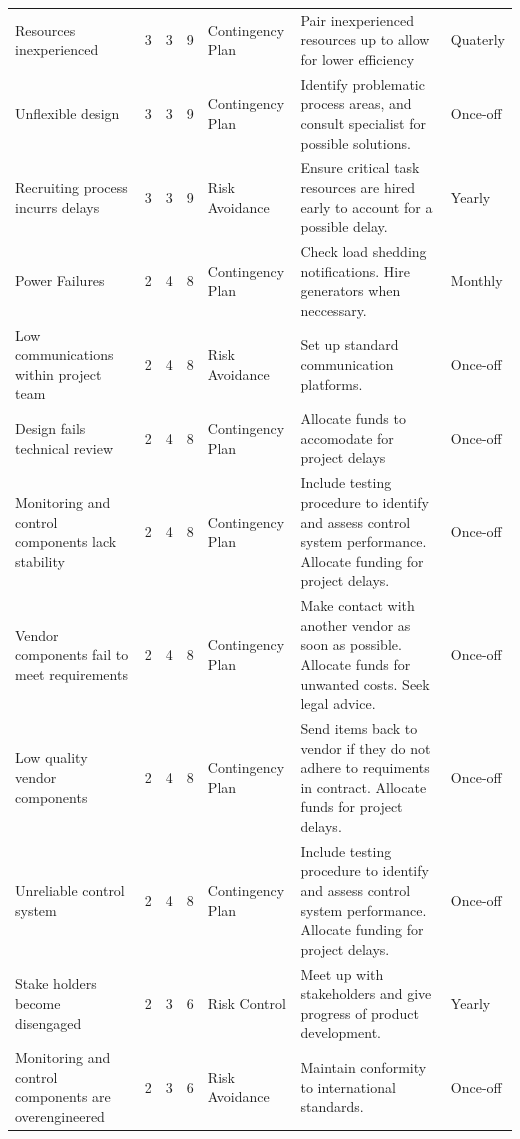 \begin{landscape}
\begin{table}[H]
{\begin{tabular}{lllllll}
Resources inexperienced & 3 & 3 & \cellcolor[HTML]{F8FF00}9 & Contingency Plan & Pair inexperienced resources up to allow for lower efficiency & Quaterly \\
Unflexible design & 3 & 3 & \cellcolor[HTML]{F8FF00}9 & Contingency Plan & Identify problematic process areas, and consult specialist for possible solutions. & Once-off \\
Recruiting process incurrs delays & 3 & 3 & \cellcolor[HTML]{F8FF00}9 & Risk Avoidance & Ensure critical task resources are hired early to account for a possible delay. & Yearly \\
Power Failures & 2 & 4 & \cellcolor[HTML]{F8FF00}8 & Contingency Plan & Check load shedding notifications. Hire generators when neccessary. & Monthly \\
Low communications within project team & 2 & 4 & \cellcolor[HTML]{F8FF00}8 & Risk Avoidance & Set up standard communication platforms. & Once-off \\
Design fails technical review & 2 & 4 & \cellcolor[HTML]{F8FF00}8 & Contingency Plan & Allocate funds to accomodate for project delays & Once-off \\
Monitoring and control components lack stability & 2 & 4 & \cellcolor[HTML]{F8FF00}8 & Contingency Plan & Include testing procedure to identify and assess control system performance. Allocate funding for project delays. & Once-off \\
Vendor components fail to meet requirements & 2 & 4 & \cellcolor[HTML]{F8FF00}8 & Contingency Plan & Make contact with another vendor as soon as possible. Allocate funds for unwanted costs. Seek legal advice. & Once-off \\
Low quality vendor components & 2 & 4 & \cellcolor[HTML]{F8FF00}8 & Contingency Plan & Send items back to vendor if they do not adhere to requiments in contract. Allocate funds for project delays. & Once-off \\
Unreliable control system & 2 & 4 & \cellcolor[HTML]{F8FF00}8 & Contingency Plan & Include testing procedure to identify and assess control system performance. Allocate funding for project delays. & Once-off \\
Stake holders become disengaged & 2 & 3 & \cellcolor[HTML]{F8FF00}6 & Risk Control & Meet up with stakeholders and give progress of product development. & Yearly \\
Monitoring and control components are overengineered & 2 & 3 & \cellcolor[HTML]{F8FF00}6 & Risk Avoidance & Maintain conformity to international standards. & Once-off \\

\end{tabular}}
\end{table}
\end{landscape}
